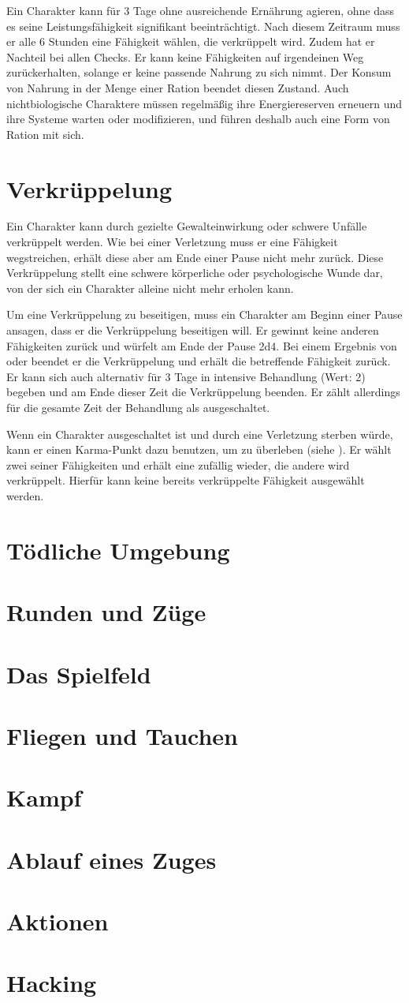 Ein Charakter kann für 3 Tage ohne ausreichende Ernährung agieren, ohne dass es seine Leistungsfähigkeit signifikant beeinträchtigt. Nach diesem Zeitraum muss er alle 6 Stunden eine Fähigkeit wählen, die verkrüppelt wird. Zudem hat er Nachteil bei allen Checks. Er kann keine Fähigkeiten auf irgendeinen Weg zurückerhalten, solange er keine passende Nahrung zu sich nimmt. Der Konsum von Nahrung in der Menge einer Ration beendet diesen Zustand. Auch nichtbiologische Charaktere müssen regelmäßig ihre Energiereserven erneuern und ihre Systeme warten oder modifizieren, und führen deshalb auch eine Form von \glqq Ration\grqq{} mit sich.
\section{Verkrüppelung}
Ein Charakter kann durch gezielte Gewalteinwirkung oder schwere Unfälle verkrüppelt werden. Wie bei einer Verletzung muss er eine Fähigkeit wegstreichen, erhält diese aber am Ende einer Pause nicht mehr zurück. Diese Verkrüppelung stellt eine schwere körperliche oder psychologische Wunde dar, von der sich ein Charakter alleine nicht mehr erholen kann.

Um eine Verkrüppelung zu beseitigen, muss ein Charakter am Beginn einer Pause ansagen, dass er die Verkrüppelung beseitigen will. Er gewinnt keine anderen Fähigkeiten zurück und würfelt am Ende der Pause 2d4. Bei einem Ergebnis von \grqq{} oder \grqq{} beendet er die Verkrüppelung und erhält die betreffende Fähigkeit zurück. Er kann sich auch alternativ für 3 Tage in intensive Behandlung (Wert: 2) begeben und am Ende dieser Zeit die Verkrüppelung beenden. Er zählt allerdings für die gesamte Zeit der Behandlung als ausgeschaltet.

Wenn ein Charakter ausgeschaltet ist und durch eine Verletzung sterben würde, kann er einen Karma-Punkt dazu benutzen, um zu überleben (siehe ). Er wählt zwei seiner Fähigkeiten und erhält eine zufällig wieder, die andere wird verkrüppelt. Hierfür kann keine bereits verkrüppelte Fähigkeit ausgewählt werden.

\section{Tödliche Umgebung}
\section{Runden und Züge}
\section{Das Spielfeld}
\section{Fliegen und Tauchen}
\section{Kampf}
\section{Ablauf eines Zuges}
\section{Aktionen}
\section{Hacking}
